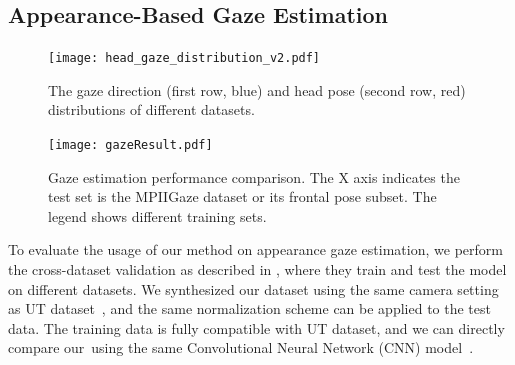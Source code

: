 
\subsection{Appearance-Based Gaze Estimation}




\begin{figure}
    \centering
    \texttt{[image: head\_gaze\_distribution\_v2.pdf]}
    \caption{The gaze direction (first row, blue) and head pose (second row, red) distributions of different datasets.}
    \label{fig:head_gaze_distribution}
\end{figure}

\begin{figure}
    \centering
    \texttt{[image: gazeResult.pdf]}
    \caption{Gaze estimation performance comparison. The X axis indicates the test set is the MPIIGaze dataset or its frontal pose subset. The legend shows different training sets.}
    \label{fig:gazeResult}
\end{figure}

To evaluate the usage of our method on appearance gaze estimation, we perform the cross-dataset validation as described in \citet{zhang15_cvpr}, where they train and test the model on different datasets. 
We synthesized our dataset using the same camera setting as UT dataset~\cite{sugano2014learning}, and the same normalization scheme can be applied to the test data.
The training data is fully compatible with UT dataset, and we can directly compare our~\dataset using the same Convolutional Neural Network (CNN) model~\cite{zhang15_cvpr}.

